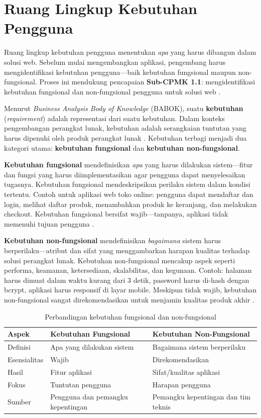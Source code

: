 \section{Ruang Lingkup Kebutuhan Pengguna}

Ruang lingkup kebutuhan pengguna menentukan \textit{apa} yang harus dibangun dalam solusi web. Sebelum mulai mengembangkan aplikasi, pengembang harus mengidentifikasi kebutuhan pengguna---baik kebutuhan fungsional maupun non-fungsional. Proses ini mendukung pencapaian \textbf{Sub-CPMK 1.1}: mengidentifikasi kebutuhan fungsional dan non-fungsional pengguna untuk solusi web \cite{altexsoftRequirements}.

Menurut \textit{Business Analysis Body of Knowledge} (BABOK), suatu \textbf{kebutuhan} (\textit{requirement}) adalah representasi dari suatu kebutuhan. Dalam konteks pengembangan perangkat lunak, kebutuhan adalah serangkaian tuntutan yang harus dipenuhi oleh produk perangkat lunak \cite{baeldungRequirements}. Kebutuhan terbagi menjadi dua kategori utama: \textbf{kebutuhan fungsional} dan \textbf{kebutuhan non-fungsional}.

\textbf{Kebutuhan fungsional} mendefinisikan \textit{apa} yang harus dilakukan sistem---fitur dan fungsi yang harus diimplementasikan agar pengguna dapat menyelesaikan tugasnya. Kebutuhan fungsional mendeskripsikan perilaku sistem dalam kondisi tertentu. Contoh untuk aplikasi web toko online: pengguna dapat mendaftar dan login, melihat daftar produk, menambahkan produk ke keranjang, dan melakukan checkout. Kebutuhan fungsional bersifat wajib---tanpanya, aplikasi tidak memenuhi tujuan pengguna \cite{altexsoftRequirements}.

\textbf{Kebutuhan non-fungsional} mendefinisikan \textit{bagaimana} sistem harus berperilaku---atribut dan sifat yang menggambarkan harapan kualitas terhadap solusi perangkat lunak. Kebutuhan non-fungsional mencakup aspek seperti performa, keamanan, ketersediaan, skalabilitas, dan kegunaan. Contoh: halaman harus dimuat dalam waktu kurang dari 3 detik, password harus di-hash dengan bcrypt, aplikasi harus responsif di layar mobile. Meskipun tidak wajib, kebutuhan non-fungsional sangat direkomendasikan untuk menjamin kualitas produk akhir \cite{baeldungRequirements}.

\begin{table}[htbp]
\centering
\begin{tabular}{|P{3cm}|P{5cm}|P{5cm}|}
\hline
\textbf{Aspek} & \textbf{Kebutuhan Fungsional} & \textbf{Kebutuhan Non-Fungsional} \\
\hline
Definisi & Apa yang dilakukan sistem & Bagaimana sistem berperilaku \\
\hline
Esensialitas & Wajib & Direkomendasikan \\
\hline
Hasil & Fitur aplikasi & Sifat/kualitas aplikasi \\
\hline
Fokus & Tuntutan pengguna & Harapan pengguna \\
\hline
Sumber & Pengguna dan pemangku kepentingan & Pemangku kepentingan dan tim teknis \\
\hline
\end{tabular}
\caption{Perbandingan kebutuhan fungsional dan non-fungsional}
\end{table}

